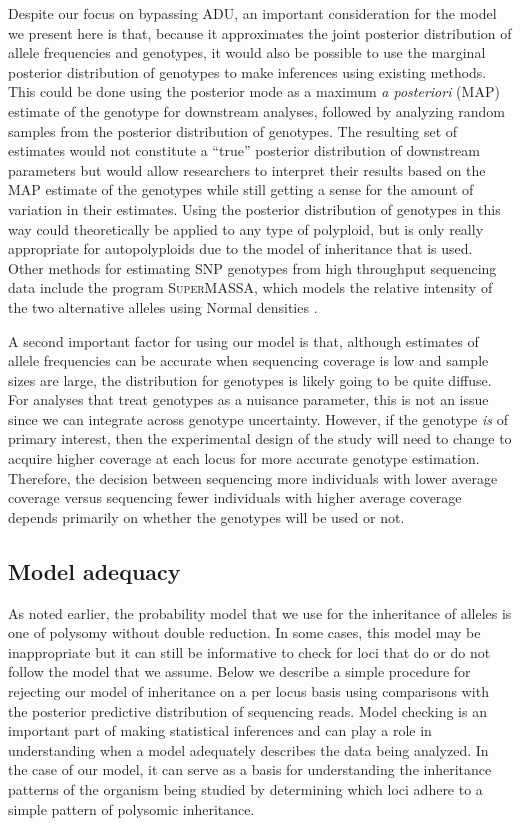 \documentclass[11pt,english,letterpaper,oneside]{article}
\begin{document}
Despite our focus on bypassing ADU, an important consideration for the model we present here is that, because it approximates the joint posterior distribution of allele frequencies and genotypes, it would also be possible to use the marginal posterior distribution of genotypes to make inferences using existing methods. This could be done using the posterior mode as a maximum \textit{a posteriori} (MAP) estimate of the genotype for downstream analyses, followed by analyzing random samples from the posterior distribution of genotypes. The resulting set of estimates would not constitute a ``true'' posterior distribution of downstream parameters but would allow researchers to interpret their results based on the MAP estimate of the genotypes while still getting a sense for the amount of variation in their estimates. Using the posterior distribution of genotypes in this way could theoretically be applied to any type of polyploid, but is only really appropriate for autopolyploids due to the model of inheritance that is used. Other methods for estimating SNP genotypes from high throughput sequencing data include the program \textsc{SuperMASSA}, which models the relative intensity of the two alternative alleles using Normal densities \citep{serang2012supermassa}.
\medskip

A second important factor for using our model is that, although estimates of allele frequencies can be accurate when sequencing coverage is low and sample sizes are large, the distribution for genotypes is likely going to be quite diffuse. For analyses that treat genotypes as a nuisance parameter, this is not an issue since we can integrate across genotype uncertainty. However, if the genotype \textit{is} of primary interest, then the experimental design of the study will need to change to acquire higher coverage at each locus for more accurate genotype estimation. Therefore, the decision between sequencing more individuals with lower average coverage versus sequencing fewer individuals with higher average coverage depends primarily on whether the genotypes will be used or not.

\medskip
\subsection*{Model adequacy}
\medskip

As noted earlier, the probability model that we use for the inheritance of alleles is one of polysomy without double reduction. In some cases, this model may be inappropriate but it can still be informative to check for loci that do or do not follow the model that we assume. Below we describe a simple procedure for rejecting our model of inheritance on a per locus basis using comparisons with the posterior predictive distribution of sequencing reads. Model checking is an important part of making statistical inferences and can play a role in understanding when a model adequately describes the data being analyzed. In the case of our model, it can serve as a basis for understanding the inheritance patterns of the organism being studied by determining which loci adhere to a simple pattern of polysomic inheritance. 
\medskip
\end{document}
